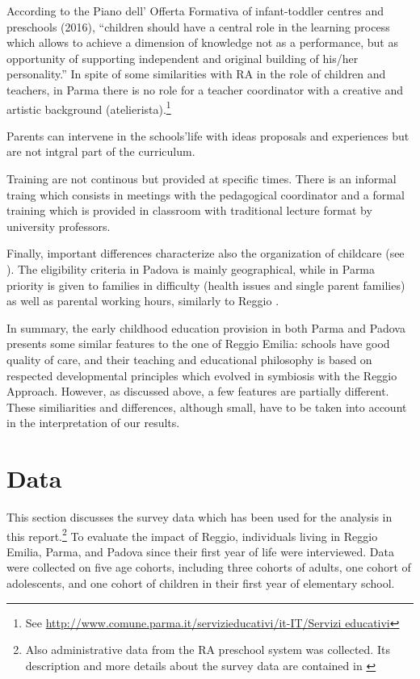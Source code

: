 \documentclass[12pt]{article}
\begin{document}
According to the Piano dell' Offerta Formativa of infant-toddler centres and preschools (2016), ``children should have a central role in the learning process which allows to achieve a dimension of knowledge not as a performance, but as opportunity of supporting independent and original building of his/her personality.'' In spite of some similarities with RA in the role of children and teachers, in Parma there is no role for a teacher coordinator with a creative and artistic background (atelierista).\footnote{See \url{http://www.comune.parma.it/servizieducativi/it-IT/Servizi educativi}}

Parents can intervene in the schools'life with ideas proposals and experiences but are not intgral part of the curriculum.

Training are not continous but provided at specific times. There is an informal traing which consists in meetings with the pedagogical coordinator and a formal training which is provided in classroom with traditional lecture format by university professors.

Finally, important differences characterize also the organization of childcare (see \cite{DelBoca2016}). The eligibility criteria in Padova is mainly geographical, while in Parma priority is given to families in difficulty (health issues and single parent families) as well as parental working hours, similarly to Reggio \citep{Frabboni1999}.

In summary, the early childhood education provision in both Parma and Padova presents some similar features to the one of Reggio Emilia: schools have good quality of care, and their teaching and educational philosophy is based on respected developmental principles which evolved in symbiosis with the Reggio Approach. However, as discussed above, a few features are partially different. These similiarities and differences, although small, have to be taken into account in the interpretation of our results.


\section{Data}
\label{sec:data}

This section discusses the survey data which has been used for the analysis in this report.\footnote{Also administrative data from the RA preschool system was collected. Its description and more details about the survey data are contained in \citet{Biroli2015}} To evaluate the impact of Reggio, individuals living in Reggio Emilia, Parma, and Padova since their first year of life were interviewed. Data were collected on five age cohorts, including three cohorts of adults, one cohort of adolescents, and one cohort of children in their first year of elementary school.
\end{document}
